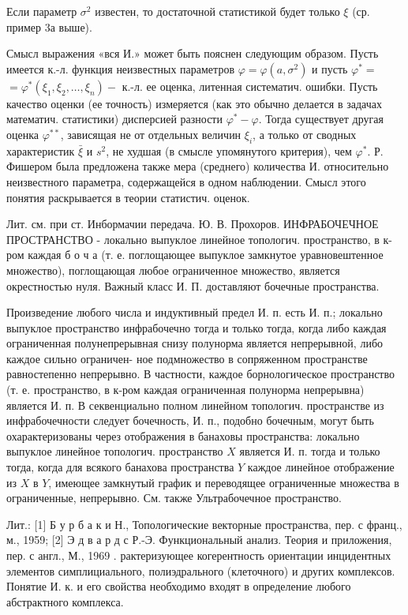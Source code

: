 \documentclass[10pt]{article}
\begin{document}
Если параметр $\sigma^{2}$ известен, то достаточной статистикой будет только $\xi$ (ср. пример 3а выше).



Смысл выражения «вся И.» может быть пояснен следующим образом. Пусть имеется к.-л. функция неизвестных параметров $\varphi=\varphi\left(a, \sigma^{2}\right)$ и пусть $\varphi^{*}=$ $=\varphi^{*}\left(\xi_{1}, \xi_{2}, \ldots, \xi_{n}\right)-$ к.-л. ее оценка, литенная систематич. ошибки. Пусть качество оценки (ее точность) измеряется (как это обычно делается в задачах математич. статистики) дисперсией разности $\varphi^{*}-\varphi$. Тогда существует другая оценка $\varphi^{* *}$, зависящая не от отдельных величин $\xi_{i}$, а только от сводных характеристик $\bar{\xi}$ и $s^{2}$, не худшая (в смысле упомянутого критерия), чем $\varphi^{*}$. Р. Фишером была предложена также мера (среднего) количества И. относительно неизвестного параметра, содержащейся в одном наблюдении. Смысл этого понятия раскрывается в теории статистич. оценок.



Лит. см. при ст. Инбормачии передача. Ю. В. Прохоров. ИНФРАБОЧЕЧНОЕ ПРОСТРАНСТВО - локально выпуклое линейное топологич. пространство, в к-ром каждая б о ч а (т. е. поглощающее выпуклое замкнутое уравновештенное множество), поглощающая любое ограниченное множество, является окрестностью нуля. Важный класс И. П. доставляют бочечные пространства.



Произведение любого числа и индуктивный предел И. п. есть И. п.; локально выпуклое пространство инфрабочечно тогда и только тогда, когда либо каждая ограниченная полунепрерывная снизу полунорма является непрерывной, либо каждое сильно ограничен- ное подмножество в сопряженном пространстве равностепенно непрерывно. В частности, каждое борнологическое пространство (т. е. пространство, в к-ром каждая ограниченная полунорма непрерывна) является И. п. В секвенциально полном линейном топологич. пространстве из инфрабочечности следует бочечность, И. п., подобно бочечным, могут быть охарактеризованы через отображения в банаховы пространства: локально выпуклое линейное топологич. пространство $X$ является И. п. тогда и только тогда, когда для всякого банахова пространства $Y$ каждое линейное отображение из $X$ в $Y$, имеющее замкнутый график и переводящее ограниченные множества в ограниченные, непрерывно. См. также Ультрабочечное пространство.



Лит.: [1] Б у р б а к и Н., Топологические векторные пространства, пер. с франц., м., 1959; [2] Э д в а р д с Р.-Э. Функциональный анализ. Теория и приложения, пер. с англ., М., 1969 . рактеризующее когерентность ориентации инцидентных элементов симплициального, полиэдрального (клеточного) и других комплексов. Понятие И. к. и его свойства необходимо входят в определение любого абстрактного комплекса.
\end{document}

